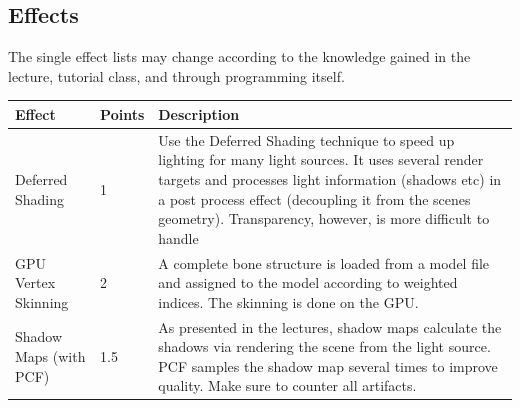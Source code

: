 \documentclass[12pt]{article}
\begin{document}
\subsection*{Effects}
The single effect lists may change according to the knowledge gained in the lecture, tutorial class, and through programming itself.

\begin{table}[h]
	\centering
	\begin{tabular}{l| l | p{11cm}}
		\textbf{Effect} & \textbf{Points} & \textbf{Description}\\
		\hline
		Deferred Shading & 1 & Use the Deferred Shading technique to speed up lighting for many light sources.
		It uses several render targets and processes light information (shadows etc) in a post process effect (decoupling it from the scenes geometry).
		Transparency, however, is more difficult to handle	\\
		\hline
		GPU Vertex Skinning &	2 &	A complete bone structure is loaded from a model file and assigned to the model according to weighted indices.
		The skinning is done on the GPU. \\
		\hline
		Shadow Maps (with PCF) & 1.5 & As presented in the lectures, shadow maps calculate the shadows via rendering the scene from the light source.
		PCF samples the shadow map several times to improve quality.
		Make sure to counter all artifacts.\\
	\end{tabular}
\end{table}
\end{document}
